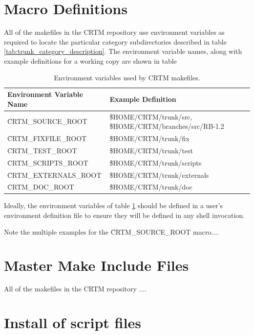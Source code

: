 \section{Macro Definitions}
All of the makefiles in the CRTM repository use environment variables as required to locate the particular category subdirectories described in table \ref{tab:trunk_category_description}. The environment variable names, along with example definitions for a working copy are shown in table

\begin{table}[htb]
  \centering
  \begin{tabular}{p{4.5cm} p{9.5cm}}
    \hline
    \sffamily\textbf{Environment Variable Name} & \sffamily\textbf{Example Definition} \\
    \hline\hline
    \f{CRTM\_SOURCE\_ROOT}    & \f{\$HOME/CRTM/trunk/src}, \f{\$HOME/CRTM/branches/src/RB-1.2}\\
    \f{CRTM\_FIXFILE\_ROOT}   & \f{\$HOME/CRTM/trunk/fix} \\
    \f{CRTM\_TEST\_ROOT}      & \f{\$HOME/CRTM/trunk/test} \\
    \f{CRTM\_SCRIPTS\_ROOT}   & \f{\$HOME/CRTM/trunk/scripts} \\
    \f{CRTM\_EXTERNALS\_ROOT} & \f{\$HOME/CRTM/trunk/externals} \\
    \f{CRTM\_DOC\_ROOT}       & \f{\$HOME/CRTM/trunk/doc} \\
    \hline
  \end{tabular}
  \caption{Environment variables used by CRTM makefiles.}
  \label{tab:macro_description}
\end{table}

Ideally, the environment variables of table \ref{tab:macro_description} should be defined in a user's environment definition file to ensure they will be defined in any shell invocation.


Note the multiple examples for the \f{CRTM\_SOURCE\_ROOT} macro....


\section{Master Make Include Files}
All of the makefiles in the CRTM repository ....



\section{Install of script files}





